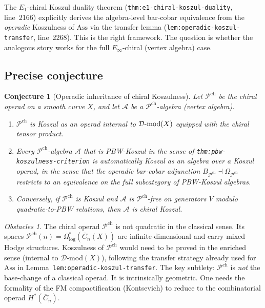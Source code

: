 \documentclass[11pt]{article}
\newtheorem{conjecture}{Conjecture}
\theoremstyle{definition}
\theoremstyle{remark}
\newtheorem*{obstacle}{Obstacles}
\newcommand{\Pch}{\mathcal{P}^{\mathrm{ch}}}
\newcommand{\FM}{\overline{C}}
\newcommand{\cA}{\mathcal{A}}
\begin{document}
The $E_1$-chiral Koszul duality theorem
(\texttt{thm:e1-chiral-koszul-duality}, line~2166) explicitly
derives the algebra-level bar-cobar equivalence from the
\emph{operadic} Koszulness of $\mathrm{Ass}$ via the transfer lemma
(\texttt{lem:operadic-koszul-transfer}, line~2268).  This is the
right framework.  The question is whether the analogous story works
for the full $E_\infty$-chiral (vertex algebra) case.

\subsection{Precise conjecture}

\begin{conjecture}[Operadic inheritance of chiral Koszulness]
\label{conj:operadic-inheritance}
Let $\Pch$ be the chiral operad on a smooth curve $X$, and let
$\cA$ be a $\Pch$-algebra (vertex algebra).
\begin{enumerate}
\item $\Pch$ is Koszul as an operad internal to
  $\mathcal{D}\textnormal{-mod}(X)$ equipped with the chiral tensor
  product.
\item Every $\Pch$-algebra $\cA$ that is PBW-Koszul in the sense of
  \texttt{thm:pbw-koszulness-criterion} is automatically Koszul
  \emph{as an algebra over a Koszul operad}, in the sense that the
  operadic bar-cobar adjunction
  $B_{\Pch} \dashv \Omega_{\Pch}$ restricts to an equivalence on
  the full subcategory of PBW-Koszul algebras.
\item Conversely, if $\Pch$ is Koszul and $\cA$ is
  $\Pch$-free on generators $V$ modulo quadratic-to-PBW relations,
  then $\cA$ is chiral Koszul.
\end{enumerate}
\end{conjecture}

\begin{obstacle}
The chiral operad $\Pch$ is not quadratic in the classical sense.
Its spaces $\Pch(n) = \Omega^*_{\log}(\FM_n(X))$ are
infinite-dimensional and carry mixed Hodge structures.  Koszulness
of $\Pch$ would need to be proved in the enriched sense
(internal to $\mathcal{D}$-mod$(X)$), following the transfer
strategy already used for $\mathrm{Ass}$ in
Lemma~\texttt{lem:operadic-koszul-transfer}.  The key subtlety:
$\Pch$ is \emph{not} the base-change of a classical operad.  It is
intrinsically geometric.  One needs the formality of the
FM compactification (Kontsevich) to reduce to the combinatorial
operad $H^*(\FM_n)$.
\end{obstacle}
\end{document}
